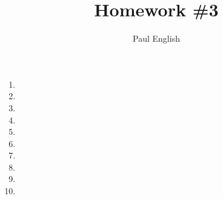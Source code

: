 \documentclass[11pt, oneside]{article}
\title{Homework \#3}
\author{Paul English}
\begin{document}
\maketitle

\begin{enumerate}

\item 
\item 
\item 
\item 
\item 
\item 
\item 
\item 
\item 
\item 

\end{enumerate}
\end{document}
